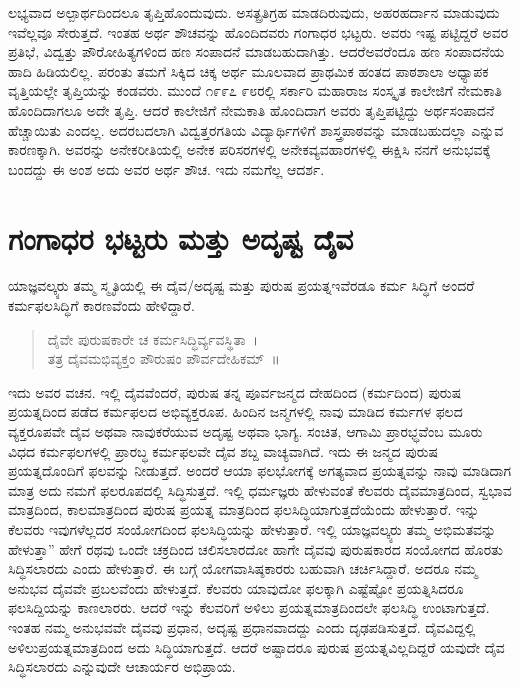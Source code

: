 {ಲಭ್ಯವಾದ ಅಲ್ಪಾರ್ಥದಿಂದಲೂ ತೃಪ್ತಿಹೊಂದುವುದು. ಅಸತ್ಪ್ರತಿಗ್ರಹ ಮಾಡದಿರುವುದು, ಅಹರಹರ್ದಾನ ಮಾಡುವುದು ಇವೆಲ್ಲವೂ ಸೇರುತ್ತದೆ. ಇಂತಹ ಅರ್ಥ ಶೌಚವನ್ನು ಹೊಂದಿದವರು ಗಂಗಾಧರ ಭಟ್ಟರು. ಅವರು ಇಷ್ಟ ಪಟ್ಟಿದ್ದರೆ ಅವರ ಪ್ರತಿಭೆ, ವಿದ್ವತ್ತು ಪೌರೋಹಿತ್ಯಗಳಿಂದ ಹಣ ಸಂಪಾದನೆ ಮಾಡಬಹುದಾಗಿತ್ತು. ಆದರೆ\break ಅವರೆಂದೂ ಹಣ ಸಂಪಾದನೆಯ ಹಾದಿ ಹಿಡಿಯಲಿಲ್ಲ. ಪರಂತು ತಮಗೆ ಸಿಕ್ಕಿದ ಚಿಕ್ಕ ಅರ್ಥ ಮೂಲವಾದ ಪ್ರಾಥಮಿಕ ಹಂತದ ಪಾಠಶಾಲಾ ಅಧ್ಯಾಪಕ ವೃತ್ತಿಯಲ್ಲೇ ತೃಪ್ತಿಯನ್ನು ಕಂಡವರು. ಮುಂದೆ ೧೯೯೭  \enginline{-}  ೯೮ರಲ್ಲಿ ಸರ್ಕಾರಿ ಮಹಾರಾಜ ಸಂಸ್ಕೃತ ಕಾಲೇಜಿಗೆ ನೇಮಕಾತಿ ಹೊಂದಿದಾಗಲೂ ಅದೇ ತೃಪ್ತಿ. ಆದರೆ ಕಾಲೇಜಿಗೆ ನೇಮಕಾತಿ ಹೊಂದಿದಾಗ ಅವರು ತೃಪ್ತಿಪಟ್ಟಿದ್ದು ಅರ್ಥಸಂಪಾದನೆ ಹೆಚ್ಚಾಯಿತು ಎಂದಲ್ಲ. ಅದರ\break ಬದಲಾಗಿ ವಿದ್ವತ್ತರಗತಿಯ ವಿದ್ಯಾರ್ಥಿಗಳಿಗೆ ಶಾಸ್ತ್ರಪಾಠವನ್ನು ಮಾಡಬಹುದಲ್ಲಾ ಎನ್ನುವ ಕಾರಣಕ್ಕಾಗಿ. ಅವರನ್ನು ಅನೇಕರೀತಿಯಲ್ಲಿ ಅನೇಕ ಪರಿಸರಗಳಲ್ಲಿ ಅನೇಕ\break  ವ್ಯವಹಾರಗಳಲ್ಲಿ ಈಕ್ಷಿಸಿ ನನಗೆ ಅನುಭವಕ್ಕೆ ಬಂದದ್ದು ಈ ಅಂಶ   \enginline{-}   ಅದು ಅವರ ಅರ್ಥ ಶೌಚ. ಇದು ನಮಗೆಲ್ಲ ಆದರ್ಶ. 

\section*{ಗಂಗಾಧರ ಭಟ್ಟರು ಮತ್ತು ಅದೃಷ್ಟ   \enginline{-}   ದೈವ}

ಯಾಜ್ಞವಲ್ಕ್ಯರು ತಮ್ಮ ಸ್ಮೃತಿಯಲ್ಲಿ ಈ ದೈವ/ಅದೃಷ್ಟ ಮತ್ತು ಪುರುಷ ಪ್ರಯತ್ನ\break ಇವೆರಡೂ ಕರ್ಮ ಸಿದ್ಧಿಗೆ ಅಂದರೆ ಕರ್ಮಫಲಸಿದ್ಧಿಗೆ ಕಾರಣವೆಂದು ಹೇಳಿದ್ದಾರೆ.
\begin{verse}
ದೈವೇ ಪುರುಷಕಾರೇ ಚ ಕರ್ಮಸಿದ್ಧಿರ್ವ್ಯವಸ್ಥಿತಾ~।\\
ತತ್ರ ದೈವಮಭಿವ್ಯಕ್ತಂ ಪೌರುಷಂ ಪೌರ್ವದೇಹಿಕಮ್~॥
\end{verse}
ಇದು ಅವರ ವಚನ. ಇಲ್ಲಿ ದೈವವೆಂದರೆ, ಪುರುಷ ತನ್ನ ಪೂರ್ವಜನ್ಮದ ದೇಹದಿಂದ (ಕರ್ಮದಿಂದ) ಪುರುಷ ಪ್ರಯತ್ನದಿಂದ ಪಡೆದ ಕರ್ಮಫಲದ ಅಭಿವ್ಯಕ್ತರೂಪ. ಹಿಂದಿನ ಜನ್ಮಗಳಲ್ಲಿ ನಾವು ಮಾಡಿದ ಕರ್ಮಗಳ ಫಲದ ವ್ಯಕ್ತರೂಪವೇ ದೈವ ಅಥವಾ ನಾವು\break ಕರೆಯುವ ಅದೃಷ್ಟ ಅಥವಾ ಭಾಗ್ಯ. ಸಂಚಿತ, ಆಗಾಮಿ ಪ್ರಾರಭ್ಧವೆಂಬ ಮೂರು ವಿಧದ ಕರ್ಮಫಲಗಳಲ್ಲಿ ಪ್ರಾರಬ್ಧ ಕರ್ಮಫಲವೇ ದೈವ ಶಬ್ದ ವಾಚ್ಯವಾಗಿದೆ. ಇದು ಈ ಜನ್ಮದ ಪುರುಷ ಪ್ರಯತ್ನದೊಂದಿಗೆ ಫಲವನ್ನು ನೀಡುತ್ತದೆ. ಅಂದರೆ ಆಯಾ ಫಲಭೋಗಕ್ಕೆ ಅಗತ್ಯ\-ವಾದ ಪ್ರಯತ್ನವನ್ನು ನಾವು ಮಾಡಿದಾಗ ಮಾತ್ರ ಅದು ನಮಗೆ ಫಲರೂಪದಲ್ಲಿ ಸಿದ್ಧಿಸುತ್ತದೆ. ಇಲ್ಲಿ ಧರ್ಮಜ್ಞರು ಹೇಳುವಂತೆ ಕೆಲವರು ದೈವಮಾತ್ರದಿಂದ, ಸ್ವಭಾವ ಮಾತ್ರದಿಂದ, ಕಾಲಮಾತ್ರದಿಂದ ಪುರುಷ ಪ್ರಯತ್ನ ಮಾತ್ರದಿಂದ ಫಲಸಿದ್ಧಿಯಾಗು\-ತ್ತದೆಯೆಂದು ಹೇಳುತ್ತಾರೆ. ಇನ್ನು ಕೆಲವರು ಇವುಗಳೆಲ್ಲದರ ಸಂಯೋಗದಿಂದ ಫಲಸಿದ್ಧಿಯನ್ನು ಹೇಳುತ್ತಾರೆ. ಇಲ್ಲಿ ಯಾಜ್ಞವಲ್ಕ್ಯರು ತಮ್ಮ ಅಭಿಮತವನ್ನು ಹೇಳುತ್ತಾ” ಹೇಗೆ ರಥವು ಒಂದೇ ಚಕ್ರದಿಂದ ಚಲಿಸಲಾರದೋ ಹಾಗೇ ದೈವವು ಪುರುಷಕಾರದ ಸಂಯೋಗದ ಹೊರತು ಸಿದ್ಧಿಸಲಾರದು ಎಂದು ಹೇಳುತ್ತಾರೆ. ಈ ಬಗ್ಗೆ ಯೋಗವಾಸಿಷ್ಠಕಾರರು ಬಹುವಾಗಿ ಚರ್ಚಿಸಿದ್ದಾರೆ. ಅದರೂ ನಮ್ಮ ಅನುಭವ ದೈವವೇ ಪ್ರಬಲವೆಂದು ಹೇಳುತ್ತದೆ. ಕೆಲವರು ಯಾವುದೋ ಫಲಕ್ಕಾಗಿ ಎಷ್ಟೆಷ್ಟೋ ಪ್ರಯತ್ನಿಸಿದರೂ ಫಲಸಿದ್ದಿಯನ್ನು ಕಾಣಲಾರರು. ಆದರೆ ಇನ್ನು ಕೆಲವರಿಗೆ ಅಳಿಲು ಪ್ರಯತ್ನಮಾತ್ರದಿಂದಲೇ ಫಲಸಿದ್ಧಿ ಉಂಟಾಗುತ್ತದೆ. ಇಂತಹ ನಮ್ಮ ಅನುಭವವೇ ದೈವವು ಪ್ರಧಾನ, ಅದೃಷ್ಟ ಪ್ರಧಾನ\-ವಾದದ್ದು ಎಂದು ದೃಢಪಡಿಸುತ್ತದೆ. ದೈವವಿದ್ದಲ್ಲಿ ಅಳಿಲುಪ್ರಯತ್ನಮಾತ್ರದಿಂದ ಅದು ಸಿದ್ಧಿಯಾಗುತ್ತದೆ. ಆದರೆ ಅಷ್ಟಾದರೂ ಪುರುಷ ಪ್ರಯತ್ನವಿಲ್ಲದಿದ್ದರೆ ಯವುದೇ ದೈವ ಸಿದ್ಧಿಸಲಾರದು ಎನ್ನುವುದೇ ಆಚಾರ್ಯರ ಅಭಿಪ್ರಾಯ. 

}
